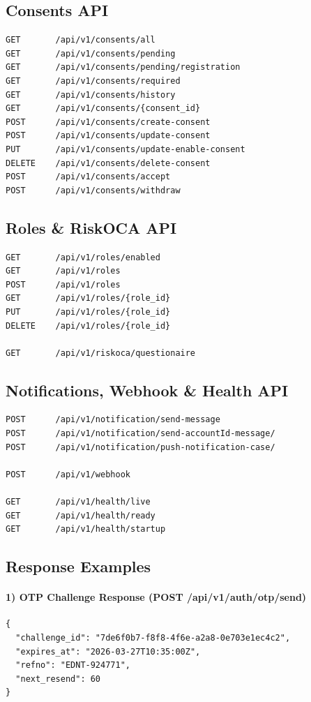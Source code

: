 \subsection*{Consents API}
\begin{verbatim}
GET       /api/v1/consents/all
GET       /api/v1/consents/pending
GET       /api/v1/consents/pending/registration
GET       /api/v1/consents/required
GET       /api/v1/consents/history
GET       /api/v1/consents/{consent_id}
POST      /api/v1/consents/create-consent
POST      /api/v1/consents/update-consent
PUT       /api/v1/consents/update-enable-consent
DELETE    /api/v1/consents/delete-consent
POST      /api/v1/consents/accept
POST      /api/v1/consents/withdraw
\end{verbatim}

\subsection*{Roles \& RiskOCA API}
\begin{verbatim}
GET       /api/v1/roles/enabled
GET       /api/v1/roles
POST      /api/v1/roles
GET       /api/v1/roles/{role_id}
PUT       /api/v1/roles/{role_id}
DELETE    /api/v1/roles/{role_id}

GET       /api/v1/riskoca/questionaire
\end{verbatim}

\subsection*{Notifications, Webhook \& Health API}
\begin{verbatim}
POST      /api/v1/notification/send-message
POST      /api/v1/notification/send-accountId-message/
POST      /api/v1/notification/push-notification-case/

POST      /api/v1/webhook

GET       /api/v1/health/live
GET       /api/v1/health/ready
GET       /api/v1/health/startup
\end{verbatim}

\subsection*{Response Examples }

\paragraph*{1) OTP Challenge Response (POST /api/v1/auth/otp/send)}
\begin{verbatim}
{
  "challenge_id": "7de6f0b7-f8f8-4f6e-a2a8-0e703e1ec4c2",
  "expires_at": "2026-03-27T10:35:00Z",
  "refno": "EDNT-924771",
  "next_resend": 60
}
\end{verbatim}

